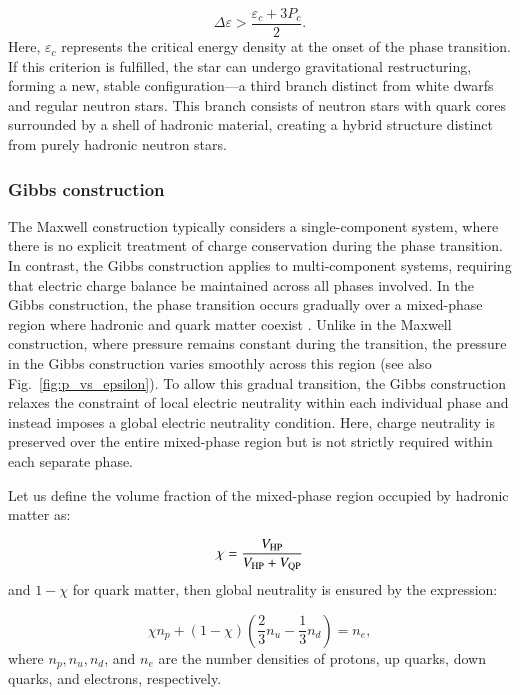 \documentclass[main.tex]{subfiles}
\begin{document}
    \begin{equation}
        \Delta \varepsilon > \frac{\varepsilon_c + 3P_c}{2}.
        \label{eq:seidov_criterion}
    \end{equation}
    Here, $\varepsilon_c$ represents the critical energy density at the onset of the phase transition. If this criterion is fulfilled, the star can undergo gravitational restructuring, forming a new, stable configuration---a third branch distinct from white dwarfs and regular neutron stars. This branch consists of neutron stars with quark cores surrounded by a shell of hadronic material, creating a hybrid structure distinct from purely hadronic neutron stars.

    \subsubsection{Gibbs construction}
    The Maxwell construction typically considers a single-component system, where there is no explicit treatment of charge conservation during the phase transition. In contrast, the Gibbs construction applies to multi-component systems, requiring that electric charge balance be maintained across all phases involved.
    In the Gibbs construction, the phase transition occurs gradually over a mixed-phase region where hadronic and quark matter coexist \citep[see][]{Glendenning:1992vb}. Unlike in the Maxwell construction, where pressure remains constant during the transition, the pressure in the Gibbs construction varies smoothly across this region (see also Fig.~\ref{fig:p_vs_epsilon}). To allow this gradual transition, the Gibbs construction relaxes the constraint of local electric neutrality within each individual phase and instead imposes a global electric neutrality condition. Here, charge neutrality is preserved over the entire mixed-phase region but is not strictly required within each separate phase.

    Let us define the volume fraction of the mixed-phase region occupied by hadronic matter as:

    \begin{equation}
        \chi = \frac{V_{\rm HP}}{V_{\rm HP} + V_{\rm QP}}
    \end{equation}
    and $1-\chi$ for quark matter, then global neutrality is ensured by the expression:

    \begin{equation}
        \chi n_p + (1-\chi)\left(\frac{2}{3} n_u - \frac{1}{3}n_d \right) = n_e,
    \end{equation}
    where $n_p, n_u, n_d$, and $n_e$ are the number densities of protons, up quarks, down quarks, and electrons, respectively.
\end{document}
